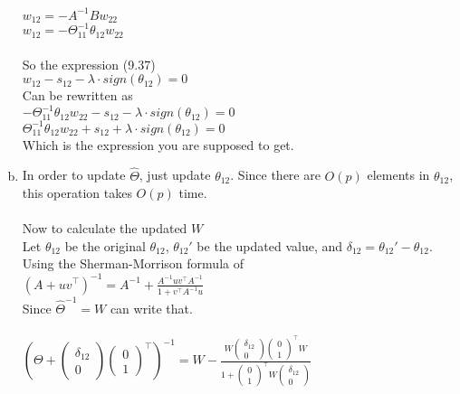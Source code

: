 \documentclass[11pt]{article}
\begin{document}
\begin{enumerate}[a)]
$w_{12} = -A^{-1} B w_{22}$\\
$w_{12} = -\Theta_{11}^{-1} \theta_{12} w_{22}$\\
\\
So the expression (9.37)\\
$w_{12} - s_{12} - \lambda \cdot sign(\theta_{12}) = 0$\\
Can be rewritten as\\
$-\Theta_{11}^{-1} \theta_{12} w_{22} - s_{12} - \lambda \cdot sign(\theta_{12}) = 0$\\
$\Theta_{11}^{-1} \theta_{12} w_{22} + s_{12} + \lambda \cdot sign(\theta_{12}) = 0$\\
Which is the expression you are supposed to get.

\item
In order to update $\hat{\Theta}$, just update $\theta_{12}$. Since there are $O(p)$ elements in $\theta_{12}$, this operation takes $O(p)$ time.\\
\\
Now to calculate the updated $W$\\
Let $\theta_{12}$ be the original $\theta_{12}$, $\theta_{12}'$ be the updated value, and $\delta_{12} = \theta_{12}' - \theta_{12}$.\\
Using the Sherman-Morrison formula of\\
$(A + uv^\top)^{-1} = A^{-1} + \frac{A^{-1} u v^\top A^{-1}}{1 + v^\top A^{-1} u}$\\
Since $\hat{\Theta}^{-1} = W$ can write that.\\
\\
$(\Theta + \begin{pmatrix} \delta_{12} \\ 0 \end{pmatrix} \begin{pmatrix} 0 \\ 1 \end{pmatrix}^\top)^{-1} = W - \frac{W \begin{pmatrix} \delta_{12} \\ 0 \end{pmatrix} \begin{pmatrix} 0 \\ 1 \end{pmatrix}^\top W}{1 + \begin{pmatrix} 0 \\ 1 \end{pmatrix}^\top W \begin{pmatrix} \delta_{12} \\ 0 \end{pmatrix}}$\\

\end{enumerate}
\end{document}
